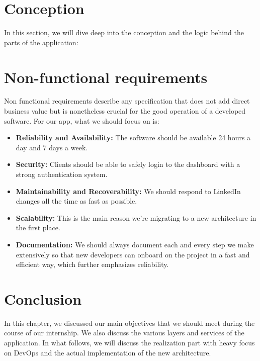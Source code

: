 \section{Conception}
In this section, we will dive deep into the conception and the logic behind the parts of the application:

\section{Non-functional requirements}
Non functional requirements describe any specification that does not add direct business value but is nonetheless crucial for the good operation of a developed software.
For our app, what we should focus on is:
\begin{itemize}
    \item \textbf{Reliability and Availability:} The software should be available 24 hours a day and 7 days a week.
    \item \textbf{Security:} Clients should be able to safely login to the dashboard with a strong authentication system.
    \item \textbf{Maintainability and Recoverability:} We should respond to LinkedIn changes all the time as fast as possible.
    \item \textbf{Scalability:} This is the main reason we're migrating to a new architecture in the first place.
    \item \textbf{Documentation:} We should always document each and every step we make extensively so that new developers can onboard on the project in a fast and efficient way, which further emphasizes reliability.
\end{itemize}

\setcounter{secnumdepth}{0} %
\section{Conclusion}
In this chapter, we discussed our main objectives that we should meet during the course of our internship.
We also discuss the various layers and services of the application.
In what follows, we will discuss the realization part with heavy focus on DevOps and the actual implementation of the new architecture.
